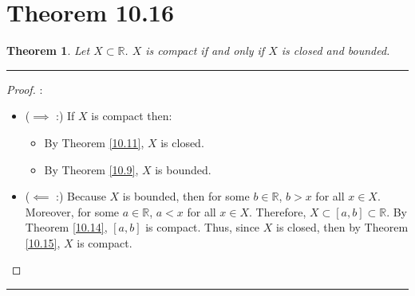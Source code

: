 \documentclass[openany, amssymb, psamsfonts]{amsart}
\newcommand{\bbR}{\mathbb{R}}
\newtheorem{thm}{Theorem}[section]
\theoremstyle{definition}
\numberwithin{equation}{section}
\begin{document}
\section*{Theorem 10.16}
\begin{thm}\label{10.16} Let $X \subset \bbR$.  $X$ is compact if and only if $X$ is closed and bounded.
\end{thm}
\vspace{4pt}     \hrule   \vspace{4pt} \begin{proof}:\\
\begin{itemize}
    \item ($\implies$ :) If $X$ is compact then:
    \begin{itemize}
        \item By Theorem \ref{10.11}, $X$ is closed.
        \item By Theorem \ref{10.9}, $X$ is bounded.
    \end{itemize}
    \item ($\impliedby$ :) Because $X$ is bounded, then for some $b\in \bbR$, $b>x$ for all $x\in X$. Moreover, for some $a\in \bbR$, $a<x$ for all $x\in X$. Therefore, $X\subset [a,b]\subset \bbR$. By Theorem \ref{10.14}, $[a,b]$ is compact. Thus, since $X$ is closed, then by Theorem \ref{10.15}, $X$ is compact.
\end{itemize}
\end{proof}\vspace{4pt}     \hrule   \vspace{4pt}
\end{document}
